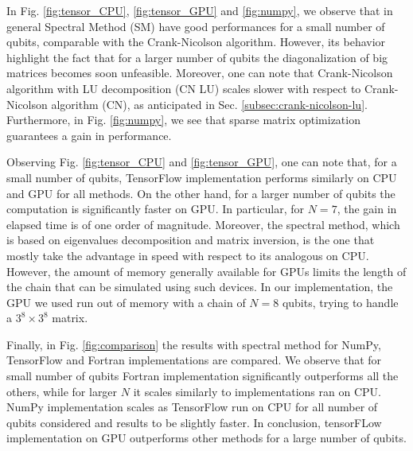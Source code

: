 \documentclass[rmp,10pt,onecolumn,fleqn,notitlepage]{revtex4-1}
\begin{document}
In Fig. \ref{fig:tensor_CPU}, \ref{fig:tensor_GPU} and \ref{fig:numpy}, we observe that in general Spectral Method (SM) have good performances for a small number of qubits, comparable with the Crank-Nicolson algorithm. However, its behavior highlight the fact that for a larger number of qubits the diagonalization of big matrices becomes soon unfeasible. Moreover, one can note that Crank-Nicolson algorithm with LU decomposition (CN LU) scales slower with respect to Crank-Nicolson algorithm (CN), as anticipated in Sec. \ref{subsec:crank-nicolson-lu}.
Furthermore, in Fig. \ref{fig:numpy}, we see that sparse matrix optimization guarantees a gain in performance. 

Observing Fig. \ref{fig:tensor_CPU} and \ref{fig:tensor_GPU}, one can note that, for a small number of qubits, TensorFlow implementation performs similarly on CPU and GPU for all methods. On the other hand, for a larger number of qubits the computation is significantly faster on GPU. In particular, for $N=7$, the gain in elapsed time is of one order of magnitude. Moreover, the spectral method, which is based on eigenvalues decomposition and matrix inversion, is the one that mostly take the advantage in speed with respect to its analogous on CPU. However, the amount of memory generally available for GPUs limits the length of the chain that can be simulated using such devices. In our implementation, the GPU we used run out of memory with a chain of $N=8$ qubits, trying to handle a $ 3^8 \times 3^8$ matrix.

Finally, in Fig. \ref{fig:comparison} the results with spectral method for NumPy, TensorFlow and Fortran implementations are compared. We observe that for small number of qubits Fortran implementation significantly outperforms all the others, while for larger $N$ it scales similarly to implementations ran on CPU. NumPy implementation scales as TensorFlow run on CPU for all number of qubits considered and results to be slightly faster. In conclusion, tensorFLow implementation on GPU outperforms other methods for a large number of qubits. 
\end{document}
